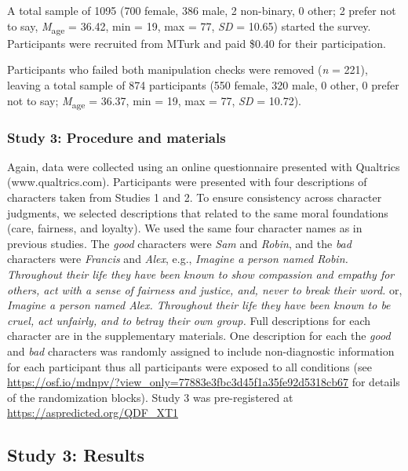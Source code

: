 \documentclass[
  english,
  man,floatsintext]{apa7}
\begin{document}
A total sample of 1095 (700 female, 386 male, 2 non-binary, 0 other; 2 prefer not to say, \emph{M}\textsubscript{age} = 36.42, min = 19, max = 77, \emph{SD} = 10.65) started the survey. Participants were recruited from MTurk and paid \$0.40 for their participation.

Participants who failed both manipulation checks were removed (\emph{n} = 221), leaving a total sample of 874 participants (550 female, 320 male, 0 other, 0 prefer not to say; \emph{M}\textsubscript{age} = 36.37, min = 19, max = 77, \emph{SD} = 10.72).

\hypertarget{study-3-procedure-and-materials}{%
\subsubsection{Study 3: Procedure and materials}\label{study-3-procedure-and-materials}}

Again, data were collected using an online questionnaire presented with Qualtrics (www.qualtrics.com). Participants were presented with four descriptions of characters taken from Studies 1 and 2. To ensure consistency across character judgments, we selected descriptions that related to the same moral foundations (care, fairness, and loyalty). We used the same four character names as in previous studies. The \emph{good} characters were \emph{Sam} and \emph{Robin}, and the \emph{bad} characters were \emph{Francis} and \emph{Alex}, e.g., \emph{Imagine a person named Robin. Throughout their life they have been known to show compassion and empathy for others, act with a sense of fairness and justice, and, never to break their word.} or, \emph{Imagine a person named Alex. Throughout their life they have been known to be cruel, act unfairly, and to betray their own group.} Full descriptions for each character are in the supplementary materials. One description for each the \emph{good} and \emph{bad} characters was randomly assigned to include non-diagnostic information for each participant thus all participants were exposed to all conditions (see \color{blue}\url{https://osf.io/mdnpv/?view_only=77883e3fbc3d45f1a35fe92d5318cb67}\color{black} for details of the randomization blocks). Study 3 was pre-registered at \color{blue}\url{https://aspredicted.org/QDF_XT1}\color{black}

\hypertarget{study-3-results}{%
\subsection{Study 3: Results}\label{study-3-results}}
\end{document}
